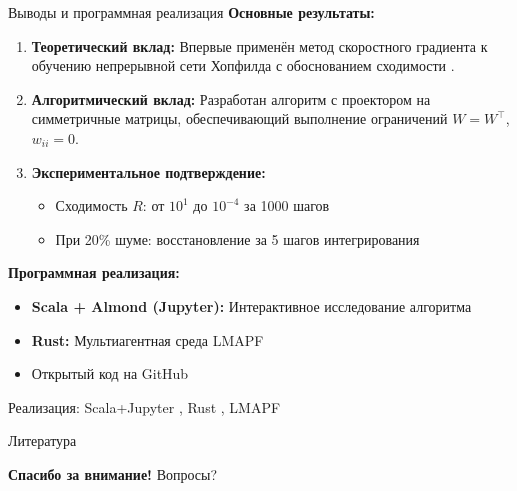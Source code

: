 \documentclass[10pt, aspectratio=169]{beamer}
\theoremstyle{plain}
\begin{document}
\begin{frame}{Выводы и программная реализация}
  \textbf{Основные результаты:}
  \begin{enumerate}
    \item \textbf{Теоретический вклад:} Впервые применён метод скоростного градиента к обучению непрерывной сети Хопфилда с обоснованием сходимости \cite{fradkov1979,fradkov2020}.

    \item \textbf{Алгоритмический вклад:} Разработан алгоритм с проектором на симметричные матрицы, обеспечивающий выполнение ограничений \(W = W^\top\), \(w_{ii} = 0\).

    \item \textbf{Экспериментальное подтверждение:}
          \begin{itemize}
            \item Сходимость \(R\): от \(10^1\) до \(10^{-4}\) за 1000 шагов
            \item При 20\% шуме: восстановление за 5 шагов интегрирования
          \end{itemize}
  \end{enumerate}

  \textbf{Программная реализация:}
  \begin{itemize}
    \item \textbf{Scala + Almond (Jupyter):} Интерактивное исследование алгоритма \cite{almond2024,perez2021jupyter}
    \item \textbf{Rust:} Мультиагентная среда LMAPF \cite{rust2024,lmapf2024}
    \item Открытый код на GitHub
  \end{itemize}

  \small{Реализация: Scala+Jupyter \cite{almond2024,perez2021jupyter}, Rust \cite{rust2024}, LMAPF \cite{lmapf2024}}
\end{frame}

\begin{frame}[allowframebreaks]{Литература}
  \printbibliography[heading=none]
\end{frame}

\begin{frame}
  \centering
  \vfill
  {\Large \textbf{Спасибо за внимание!}}
  \vfill
  \small{Вопросы?}
  \vfill
\end{frame}
\end{document}
